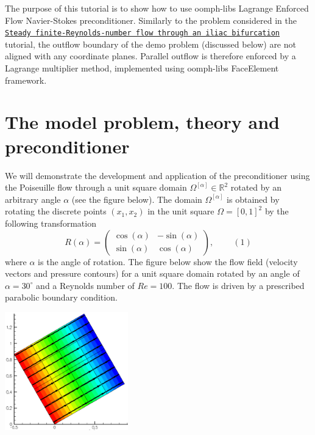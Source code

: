 The purpose of this tutorial is to show how to use {\ttfamily oomph-\/lib\textquotesingle{}s} Lagrange Enforced Flow Navier-\/\+Stokes preconditioner. Similarly to the problem considered in the \href{../../../navier_stokes/vmtk_fluid/html/index.html}{\tt Steady finite-\/\+Reynolds-\/number flow through an iliac bifurcation} tutorial, the outflow boundary of the demo problem (discussed below) are not aligned with any coordinate planes. Parallel outflow is therefore enforced by a Lagrange multiplier method, implemented using {\ttfamily oomph-\/lib\textquotesingle{}s} {\ttfamily Face\+Element} framework.



 

\hypertarget{index_model}{}\section{The model problem, theory and preconditioner}\label{index_model}
We will demonstrate the development and application of the preconditioner using the Poiseuille flow through a unit square domain $\Omega^{[\alpha]} \in \mathbb{R}^2$ rotated by an arbitrary angle $\alpha$ (see the figure below). The domain $\Omega^{[\alpha]}$ is obtained by rotating the discrete points $(x_1,x_2)$ in the unit square $\Omega = [0,1]^2$ by the following transformation \[ R(\alpha)= \left( \begin{array}{cc} {\cos(\alpha)} & {-\sin(\alpha)} \\ {\sin(\alpha)} & {\cos(\alpha)} \end{array} \right), \ \ \ \ \ \ \ \ \ \ (1) \] where $\alpha$ is the angle of rotation. The figure below show the flow field (velocity vectors and pressure contours) for a unit square domain rotated by an angle of $\alpha=30^\circ $ and a Reynolds number of $ Re = 100 $. The flow is driven by a prescribed parabolic boundary condition.

 
\begin{DoxyImage}
\includegraphics[width=0.4\textwidth]{SimAng30Rey100Noel4}
\end{DoxyImage}


